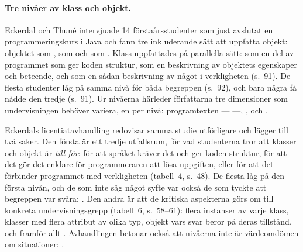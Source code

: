 \paragraph{Tre nivåer av klass och objekt.}  Eckerdal och Thuné
intervjuade 14 förstaårsstudenter som just avslutat en
programmeringskurs i Java och fann tre inkluderande sätt att uppfatta
objekt: objektet som ,
som  och som .  Klass uppfattades på parallella sätt: som en del av
programmet som ger koden struktur, som en beskrivning av objektets
egenskaper och beteende, och som en sådan beskrivning av något i
verkligheten (s.~91).  De flesta studenter låg på samma nivå för båda
begreppen (s.~92), och bara några få nådde den tredje (s.~91).  Ur nivåerna
härleder
författarna tre dimensioner som undervisningen behöver variera, en per
nivå: programtexten ---  ---,
, och .

Eckerdals licentiatavhandling\autocite{Eckerdal2006Lic} redovisar samma
studie utförligare och lägger till två saker.  Den första är ett tredje
utfallsrum, för vad studenterna tror att klasser och objekt är
\emph{till för}: för att språket kräver det och ger koden struktur, för
att det gör det enklare för programmeraren att lösa uppgiften, eller för
att det förbinder programmet med verkligheten (tabell~4, s.~48).  De
flesta låg på den första nivån, och de som inte såg något syfte var
också de som tyckte att begreppen var svåra:
.  Den andra är att
de kritiska aspekterna görs om till konkreta undervisningsgrepp (tabell~6,
s.~58--61): flera instanser av varje klass, klasser med flera attribut av
olika typ, objekt vars svar beror på deras tillstånd, och framför allt
.  Avhandlingen betonar också att nivåerna inte är
värdeomdömen om situationer: .

